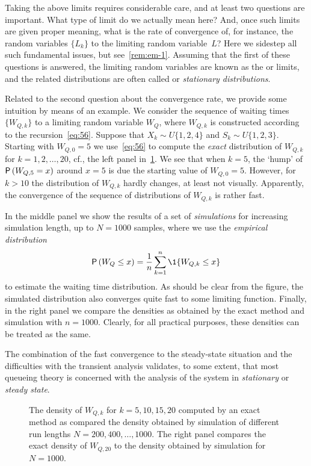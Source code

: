 \documentclass[companion]{subfiles}
\begin{document}
Taking the above limits requires considerable care, and at least two questions are important.
What type of limit do we actually mean here?
And, once such limits are given proper meaning, what is the rate of convergence of, for instance, the random variables $\{L_k\}$ to the limiting random variable~$L$?
Here we sidestep all such fundamental issues, but see~\cref{rem:em-1}.
Assuming that the first of these questions is answered, the limiting random variables are known as the  or  limits, and the related distributions are often called  or \emph{stationary distributions}.

Related to the second question about the convergence rate, we provide some intuition by means of an example.
We consider the sequence of waiting times $\{W_{Q,k}\}$ to a limiting random variable $W_Q$, where $W_{Q,k}$ is constructed according to the recursion~\cref{eq:56}.
Suppose that $X_k\sim U\{1,2,4\}$ and $S_k\sim U\{1,2,3\}$.
Starting with $W_{Q,0}=5$ we use~\cref{eq:56} to compute the \emph{exact} distribution of $W_{Q,k}$ for $k=1,2,\ldots, 20$, cf., the left panel in~\cref{fig:convergence}.
We see that when $k=5$, the `hump' of $\P{W_{Q,5}=x}$ around $x=5$ is due the starting value of $W_{Q,0}=5$.
However, for $k>10$ the distribution of $W_{Q,k}$ hardly changes, at least not visually.
Apparently, the convergence of the sequence of distributions of $W_{Q,k}$ is rather fast.

In the middle panel we show the results of a set of \emph{simulations} for increasing simulation length, up to $N=1000$ samples, where we use the \emph{empirical distribution} 
\begin{equation*}
\P{W_Q\leq x} = \frac 1n \sum_{k=1}^n \1{W_{Q,k} \leq x}
\end{equation*}
to estimate the waiting time distribution. 
As should be clear from the figure, the simulated distribution also converges quite fast to some limiting function.
Finally, in the right panel we compare the densities as obtained by the exact method and simulation with $n=1000$.
Clearly, for all practical purposes, these densities can be treated as the same.


The combination of the fast convergence to the steady-state situation and the difficulties with the transient analysis validates, to some extent, that most queueing theory is concerned with the analysis of the system in \emph{stationary} or \emph{steady state}.

\begin{figure}
 \centering



 \caption{The density of $W_{Q,k}$ for $k=5, 10, 15, 20$ computed by
 an exact method as compared the density obtained by simulation of
 different run lengths $N=200, 400, \ldots, 1000$. The right panel
 compares the exact density of $W_{Q,20}$ to the density obtained by simulation
 for $N=1000$.}
\label{fig:convergence}
\end{figure}
\end{document}
